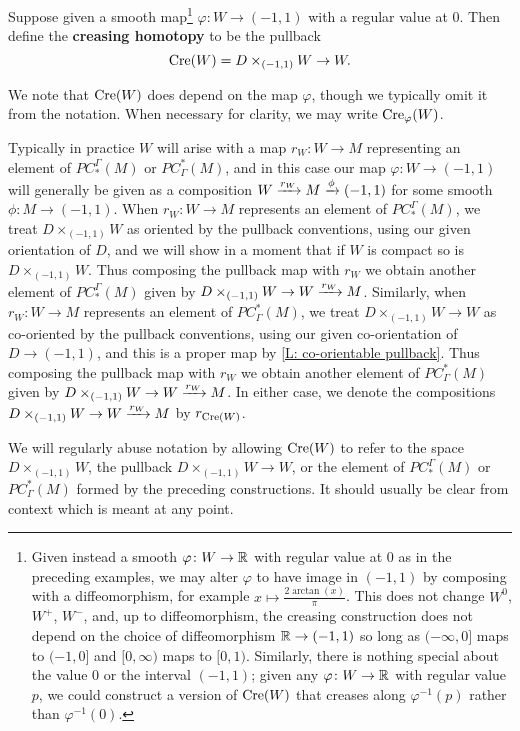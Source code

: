 \begin{definition}
	Suppose given a smooth map\footnote{Given instead a smooth $\varphi \colon W \to \mathbb{R}$ with regular value at $0$ as in the preceding examples, we may alter $\varphi$ to have image in $(-1,1)$ by composing with a diffeomorphism, for example $x \mapsto \frac{2\arctan(x)}{\pi}$.
	This does not change $W^0$, $W^+$, $W^-$, and, up to diffeomorphism, the creasing construction does not depend on the choice of diffeomorphism $\mathbb{R} \to (-1,1)$ so long as $(-\infty,0]$ maps to $(-1,0]$ and $[0,\infty)$ maps to $[0,1)$.
	Similarly, there is nothing special about the value $0$ or the interval $(-1,1)$; given any $\varphi \colon W \to \mathbb{R}$ with regular value $p$, we could construct a version of $\mathrm{Cre}(W)$ that creases along $\varphi^{-1}(p)$ rather than $\varphi^{-1}(0)$.}
	$\varphi \colon W \to (-1,1)$ with a regular value at $0$.
	Then define the \textbf{creasing homotopy} to be the pullback
	$$\mathrm{Cre}(W) = D\times_{(-1,1)} W \to W.$$

	We note that $\mathrm{Cre}(W)$ does depend on the map $\varphi$, though we typically omit it from the notation.
	When necessary for clarity, we may write $\mathrm{Cre}_\varphi(W)$.

	Typically in practice $W$ will arise with a map $r_W \colon W \to M$ representing an element of $PC_*^\Gamma(M)$ or $PC^*_\Gamma(M)$, and in this case our map $\varphi \colon W \to (-1,1)$ will generally be given as a composition
	$W \xrightarrow{r_W}M \xrightarrow{\phi} (-1,1)$ for some smooth $\phi \colon M \to (-1,1)$.
	When $r_W \colon W \to M$ represents an element of $PC_*^\Gamma(M)$, we treat $D\times_{(-1,1)} W$ as oriented by the pullback conventions, using our given orientation of $D$, and we will show in a moment that if $W$ is compact so is $D\times_{(-1,1)} W$.
	Thus composing the pullback map with $r_W$ we obtain another element of $PC_*^\Gamma(M)$ given by $D\times_{(-1,1)} W \to W \xrightarrow{r_W}M$.
	Similarly, when $r_W \colon W \to M$ represents an element of $PC^*_\Gamma(M)$, we treat $D\times_{(-1,1)} W \to W$ as co-oriented by the pullback conventions, using our given co-orientation of $D \to (-1,1)$, and this is a proper map by \cref{L: co-orientable pullback}.
	Thus composing the pullback map with $r_W$ we obtain another element of $PC^*_\Gamma(M)$ given by $D\times_{(-1,1)} W \to W \xrightarrow{r_W}M$.
	In either case, we denote the compositions $D\times_{(-1,1)} W \to W \xrightarrow{r_W}M$ by $r_{\mathrm{Cre}(W)}$.

	We will regularly abuse notation by allowing $\mathrm{Cre}(W)$ to refer to the space $D\times_{(-1,1)} W$, the pullback $D\times_{(-1,1)} W \to W$, or the element of $PC_*^\Gamma(M)$ or $PC^*_\Gamma(M)$ formed by the preceding constructions.
	It should usually be clear from context which is meant at any point.
\end{definition}

